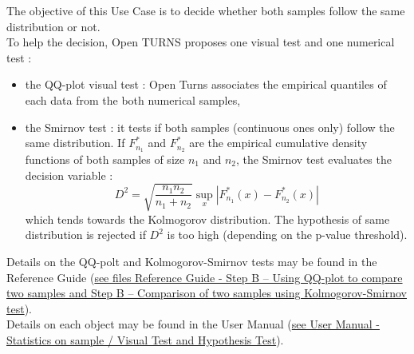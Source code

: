 \renewcommand{\filename}{docUC_InputWithData_TestSameDist.tex}
\renewcommand{\filetitle}{UC : Do two samples have the same distribution : QQ-plot visual test, Smirnov numerical test}

\HeaderIIILevel




The objective of this Use Case is to decide whether both samples follow the same distribution or not. \\

To help the decision, Open TURNS  proposes one visual test and one numerical test :
\begin{itemize}
\item the QQ-plot visual test : Open Turns associates the empirical quantiles of each data from the both numerical samples,

\item the Smirnov test : it tests if both samples (continuous ones only) follow the same distribution. If $F_{n_1}^{*}$ and $F_{n_2}^{*}$ are the empirical cumulative density functions of both samples of size $n_1$ and $n_2$, the Smirnov test evaluates the decision variable :
  $$
  D^2 = \displaystyle \sqrt{\frac{n_1n_2}{n_1+n_2}} \sup_{x}|F_{n_1}^{*}(x) - F_{n_2}^{*}(x)|
  $$
  which tends towards the Kolmogorov distribution. The hypothesis of same distribution is rejected if $D^2$ is too high (depending on the p-value threshold).
\end{itemize}



Details on the QQ-polt and Kolmogorov-Smirnov  tests may be found in the Reference Guide (\href{OpenTURNS_ReferenceGuide.pdf}{see files Reference Guide - Step B -- Using QQ-plot to compare two samples and Step B -- Comparison of two samples using Kolmogorov-Smirnov test}).\\

Details on each object may be found in the User Manual  (\href{OpenTURNS_UserManual_TUI.pdf}{see User Manual - Statistics on sample /  Visual Test and Hypothesis Test}).\\


